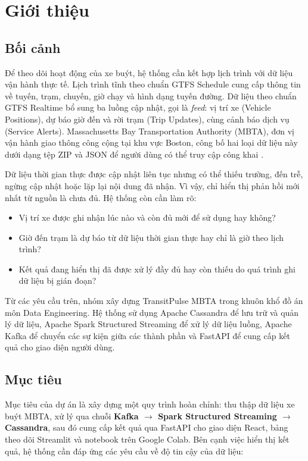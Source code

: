 \section{Giới thiệu}

\subsection{Bối cảnh}

Để theo dõi hoạt động của xe buýt, hệ thống cần kết hợp lịch trình với dữ liệu vận hành thực tế. Lịch trình tĩnh theo chuẩn GTFS Schedule \cite{gtfs_static} cung cấp thông tin về tuyến, trạm, chuyến, giờ chạy và hình dạng tuyến đường. Dữ liệu theo chuẩn GTFS Realtime \cite{gtfs_rt} bổ sung ba luồng cập nhật, gọi là \textit{feed}: vị trí xe (Vehicle Positions), dự báo giờ đến và rời trạm (Trip Updates), cùng cảnh báo dịch vụ (Service Alerts). Massachusetts Bay Transportation Authority (MBTA), đơn vị vận hành giao thông công cộng tại khu vực Boston, công bố hai loại dữ liệu này dưới dạng tệp ZIP và JSON để người dùng có thể truy cập công khai \cite{mbta_gtfs}.

Dữ liệu thời gian thực được cập nhật liên tục nhưng có thể thiếu trường, đến trễ, ngừng cập nhật hoặc lặp lại nội dung đã nhận. Vì vậy, chỉ hiển thị phản hồi mới nhất từ nguồn là chưa đủ. Hệ thống còn cần làm rõ:
\begin{itemize}
    \item Vị trí xe được ghi nhận lúc nào và còn đủ mới để sử dụng hay không?
    \item Giờ đến trạm là dự báo từ dữ liệu thời gian thực hay chỉ là giờ theo lịch trình?
    \item Kết quả đang hiển thị đã được xử lý đầy đủ hay còn thiếu do quá trình ghi dữ liệu bị gián đoạn?
\end{itemize}

Từ các yêu cầu trên, nhóm xây dựng TransitPulse MBTA trong khuôn khổ đồ án môn Data Engineering. Hệ thống sử dụng Apache Cassandra \cite{cassandra} để lưu trữ và quản lý dữ liệu, Apache Spark Structured Streaming \cite{spark,structured_streaming} để xử lý dữ liệu luồng, Apache Kafka để chuyển các sự kiện giữa các thành phần và FastAPI để cung cấp kết quả cho giao diện người dùng.

\subsection{Mục tiêu}

Mục tiêu của dự án là xây dựng một quy trình hoàn chỉnh: thu thập dữ liệu xe buýt MBTA, xử lý qua chuỗi \textbf{Kafka $\rightarrow$ Spark Structured Streaming $\rightarrow$ Cassandra}, sau đó cung cấp kết quả qua FastAPI cho giao diện React, bảng theo dõi Streamlit và notebook trên Google Colab. Bên cạnh việc hiển thị kết quả, hệ thống cần đáp ứng các yêu cầu về độ tin cậy của dữ liệu:


